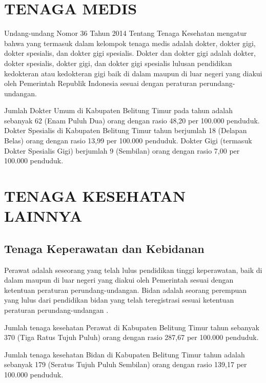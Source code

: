 \section{TENAGA MEDIS}
Undang-undang Nomor 36 Tahun 2014 Tentang Tenaga Kesehatan mengatur bahwa yang termasuk dalam kelompok tenaga medis adalah dokter, dokter gigi, dokter spesialis, dan dokter gigi spesialis.
Dokter dan dokter gigi adalah dokter, dokter spesialis, dokter gigi, dan dokter gigi spesialis lulusan pendidikan kedokteran atau kedokteran gigi baik di dalam maupun di luar negeri yang diakui oleh Pemerintah Republik Indonesia sesuai dengan peraturan perundang-undangan.

Jumlah Dokter Umum di Kabupaten Belitung Timur pada tahun \tP adalah sebanyak 62 (Enam Puluh Dua) orang dengan rasio 48,20 per 100.000 penduduk.
Dokter Spesialis di Kabupaten Belitung Timur tahun \tP berjumlah 18 (Delapan Belas) orang dengan rasio 13,99 per 100.000 penduduk.
Dokter Gigi (termasuk Dokter Spesialis Gigi) berjumlah 9 (Sembilan) orang dengan rasio 7,00 per 100.000 penduduk.

\section{TENAGA KESEHATAN LAINNYA}
\subsection{Tenaga Keperawatan dan Kebidanan}
Perawat adalah seseorang yang telah lulus pendidikan tinggi keperawatan, baik di dalam maupun di luar negeri yang diakui oleh Pemerintah sesuai dengan ketentuan peraturan perundang-undangan.
Bidan adalah seorang perempuan yang lulus dari pendidikan bidan yang telah teregistrasi sesuai ketentuan peraturan perundang-undangan .

Jumlah tenaga kesehatan Perawat di Kabupaten Belitung Timur tahun \tP sebanyak 370 (Tiga Ratus Tujuh Puluh) orang dengan rasio 287,67 per 100.000 penduduk.

Jumlah tenaga kesehatan Bidan di Kabupaten Belitung Timur tahun \tP adalah sebanyak 179 (Seratus Tujuh Puluh Sembilan) orang dengan rasio 139,17 per 100.000 penduduk.

